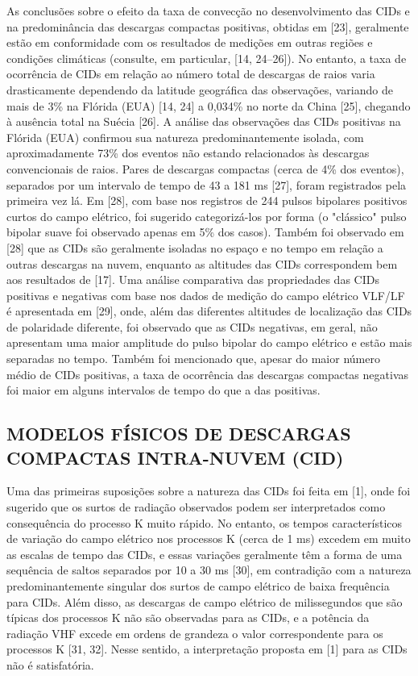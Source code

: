 \documentclass[a4paper, 12pt, onecolumn,singlespacing]{article}
\begin{document}
	As conclusões sobre o efeito da taxa de convecção no desenvolvimento das CIDs e na predominância das descargas compactas positivas, obtidas em [23], geralmente estão em conformidade com os resultados de medições em outras regiões e condições climáticas (consulte, em particular, [14, 24–26]). No entanto, a taxa de ocorrência de CIDs em relação ao número total de descargas de raios varia drasticamente dependendo da latitude geográfica das observações, variando de mais de 3\% na Flórida (EUA) [14, 24] a 0,034\% no norte da China [25], chegando à ausência total na Suécia [26]. A análise das observações das CIDs positivas na Flórida (EUA) confirmou sua natureza predominantemente isolada, com aproximadamente 73\% dos eventos não estando relacionados às descargas convencionais de raios. Pares de descargas compactas (cerca de 4\% dos eventos), separados por um intervalo de tempo de 43 a 181 ms [27], foram registrados pela primeira vez lá. Em [28], com base nos registros de 244 pulsos bipolares positivos curtos do campo elétrico, foi sugerido categorizá-los por forma (o "clássico" pulso bipolar suave foi observado apenas em 5\% dos casos). Também foi observado em [28] que as CIDs são geralmente isoladas no espaço e no tempo em relação a outras descargas na nuvem, enquanto as altitudes das CIDs correspondem bem aos resultados de [17]. Uma análise comparativa das propriedades das CIDs positivas e negativas com base nos dados de medição do campo elétrico VLF/LF é apresentada em [29], onde, além das diferentes altitudes de localização das CIDs de polaridade diferente, foi observado que as CIDs negativas, em geral, não apresentam uma maior amplitude do pulso bipolar do campo elétrico e estão mais separadas no tempo. Também foi mencionado que, apesar do maior número médio de CIDs positivas, a taxa de ocorrência das descargas compactas negativas foi maior em alguns intervalos de tempo do que a das positivas.
	
	\subsection{MODELOS FÍSICOS DE DESCARGAS COMPACTAS INTRA-NUVEM (CID)}
	
	Uma das primeiras suposições sobre a natureza das CIDs foi feita em [1], onde foi sugerido que os surtos de radiação observados podem ser interpretados como consequência do processo K muito rápido. No entanto, os tempos característicos de variação do campo elétrico nos processos K (cerca de 1 ms) excedem em muito as escalas de tempo das CIDs, e essas variações geralmente têm a forma de uma sequência de saltos separados por 10 a 30 ms [30], em contradição com a natureza predominantemente singular dos surtos de campo elétrico de baixa frequência para CIDs. Além disso, as descargas de campo elétrico de milissegundos que são típicas dos processos K não são observadas para as CIDs, e a potência da radiação VHF excede em ordens de grandeza o valor correspondente para os processos K [31, 32]. Nesse sentido, a interpretação proposta em [1] para as CIDs não é satisfatória.
	
\end{document}
